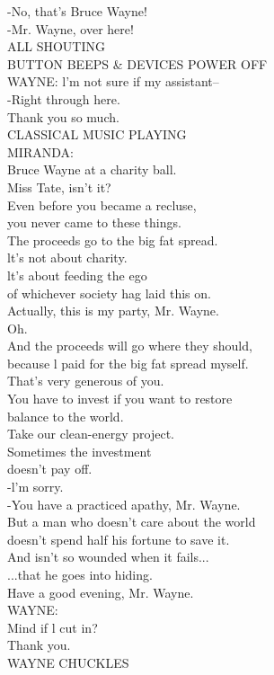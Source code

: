 \documentclass{article}
\begin{document}
\begin{multicols}{3}
-No, that's Bruce Wayne!\\
-Mr. Wayne, over here!\\
ALL SHOUTING\\
BUTTON BEEPS \& DEVICES POWER OFF\\
WAYNE: l'm not sure if my assistant--\\
-Right through here.\\
Thank you so much.\\
CLASSICAL MUSIC PLAYING\\
MIRANDA:\\
Bruce Wayne at a charity ball.\\
Miss Tate, isn't it?\\
Even before you became a recluse,\\
you never came to these things.\\
The proceeds go to the big fat spread.\\
lt's not about charity.\\
lt's about feeding the ego\\
of whichever society hag laid this on.\\
Actually, this is my party, Mr. Wayne.\\
Oh.\\
And the proceeds will go where they should,\\
because l paid for the big fat spread myself.\\
That's very generous of you.\\
You have to invest if you want to restore\\
balance to the world.\\
Take our clean-energy project.\\
Sometimes the investment\\
doesn't pay off.\\
-l'm sorry.\\
-You have a practiced apathy, Mr. Wayne.\\
But a man who doesn't care about the world\\
doesn't spend half his fortune to save it.\\
And isn't so wounded when it fails...\\
...that he goes into hiding.\\
Have a good evening, Mr. Wayne.\\
WAYNE:\\
Mind if l cut in?\\
Thank you.\\
WAYNE CHUCKLES\\

\end{multicols}
\end{document}
